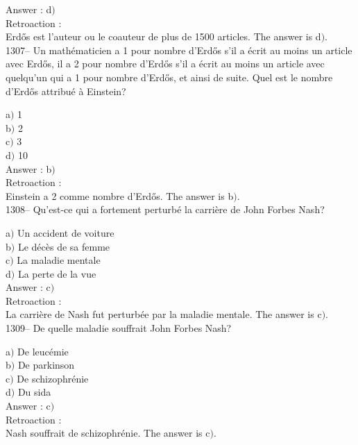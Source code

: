 ﻿\documentclass[letterpaper, 12pt]{article}
\begin{document}
Answer : d$)$\\

Retroaction : \\
Erd\H{o}s est l'auteur ou le coauteur de plus de 1500 articles.
The answer is  d$)$.\\

1307-- Un math\'ematicien a 1 pour nombre d'Erd\H{o}s s'il a \'ecrit
au moins un article avec Erd\H{o}s, il a 2 pour nombre d'Erd\H{o}s
s'il a \'ecrit au moins un article avec quelqu'un qui a 1 pour
nombre d'Erd\H{o}s, et ainsi de suite. Quel est le nombre
d'Erd\H{o}s attribu\'e \`a Einstein?

a$)$ 1 \\
b$)$ 2 \\
c$)$ 3 \\
d$)$ 10\\

Answer : b$)$\\

Retroaction : \\
Einstein a 2 comme nombre d'Erd\H{o}s.
The answer is  b$)$.\\

1308-- Qu'est-ce qui a fortement perturb\'e la carri\`ere de John
Forbes Nash?

a$)$ Un accident de voiture \\
b$)$ Le d\'ec\`es de sa femme \\
c$)$ La maladie mentale \\
d$)$ La perte de la vue\\

Answer : c$)$\\

Retroaction : \\
La carri\`ere de Nash fut perturb\'ee par la maladie mentale.
The answer is  c$)$.\\

1309-- De quelle maladie souffrait John Forbes Nash?

a$)$ De leuc\'emie \\
b$)$ De parkinson \\
c$)$ De schizophr\'enie \\
d$)$ Du sida\\

Answer : c$)$\\

Retroaction : \\
Nash souffrait de schizophr\'enie.
The answer is  c$)$.\\
\end{document}
